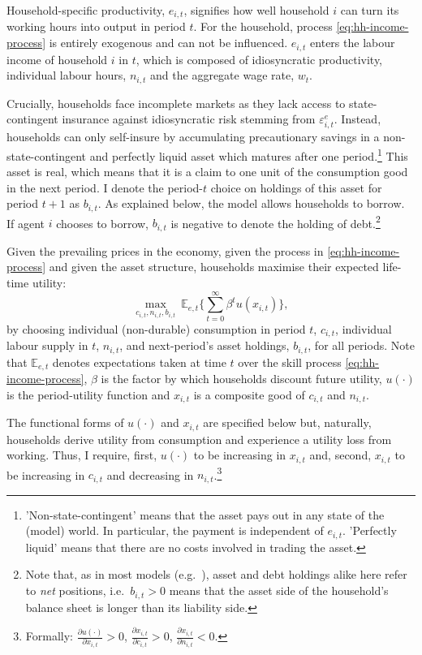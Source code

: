 \documentclass[12pt]{article} %
\numberwithin{equation}{section} %
\numberwithin{figure}{section}
\numberwithin{table}{section}
\begin{document}
Household-specific productivity, $e_{i,t}$, signifies how well household $i$ can turn its working hours into output in period $t$. For the household, process \eqref{eq:hh-income-process} is entirely exogenous and can not be influenced. $e_{i,t}$ enters the labour income of household $i$ in $t$, which is composed of idiosyncratic productivity, individual labour hours, $n_{i,t}$ and the aggregate wage rate, $w_t$.

Crucially, households face incomplete markets as they lack access to state-contingent insurance against idiosyncratic risk stemming from $\varepsilon^e_{i,t}$. Instead, households can only self-insure by accumulating precautionary savings in a non-state-contingent and perfectly liquid asset which matures after one period.\footnote{'Non-state-contingent' means that the asset pays out in any state of the (model) world. In particular, the payment is independent of $e_{i,t}$. 'Perfectly liquid' means that there are no costs involved in trading the asset.} This asset is real, which means that it is a claim to one unit of the consumption good in the next period. I denote the period-$t$ choice on holdings of this asset for period $t+1$ as $b_{i,t}$. As explained below, the model allows households to borrow. If agent $i$ chooses to borrow, $b_{i,t}$ is negative to denote the holding of debt.\footnote{Note that, as in most models (e.g.~\cite{kaplan2018}), asset and debt holdings alike here refer to \textit{net} positions, i.e.~$b_{i,t} > 0$ means that the asset side of the household's balance sheet is longer than its liability side.}

Given the prevailing prices in the economy, given the process in \eqref{eq:hh-income-process} and given the asset structure, households maximise their expected life-time utility:
\begin{equation}
    \max_{c_{i,t}, n_{i,t}, b_{i,t}} \ \mathbb{E}_{e,t} \Bigg\{ \sum_{t=0}^{\infty} \beta^t u(x_{i,t}) \Bigg\}, \label{eq:hh-objective}
\end{equation}
by choosing individual (non-durable) consumption in period $t$, $c_{i,t}$, individual labour supply in $t$, $n_{i,t}$, and next-period's asset holdings, $b_{i,t}$, for all periods. Note that $\mathbb{E}_{e,t}$ denotes expectations taken at time $t$ over the skill process \eqref{eq:hh-income-process}, $\beta$ is the factor by which households discount future utility, $u( \cdot )$ is the period-utility function and $x_{i,t}$ is a composite good of $c_{i,t}$ and $n_{i,t}$. 

The functional forms of $u( \cdot )$ and $x_{i,t}$ are specified below but, naturally, households derive utility from consumption and experience a utility loss from working. Thus, I require, first, $u( \cdot )$ to be increasing in $x_{i,t}$ and, second, $x_{i,t}$ to be increasing in $c_{i,t}$ and decreasing in $n_{i,t}$.\footnote{Formally: $\frac{\partial u( \cdot )}{\partial x_{i,t}} > 0$, $\frac{\partial x_{i,t}}{\partial c_{i,t}} > 0$, $\frac{\partial x_{i,t}}{\partial n_{i,t}} < 0$.}
\end{document}
